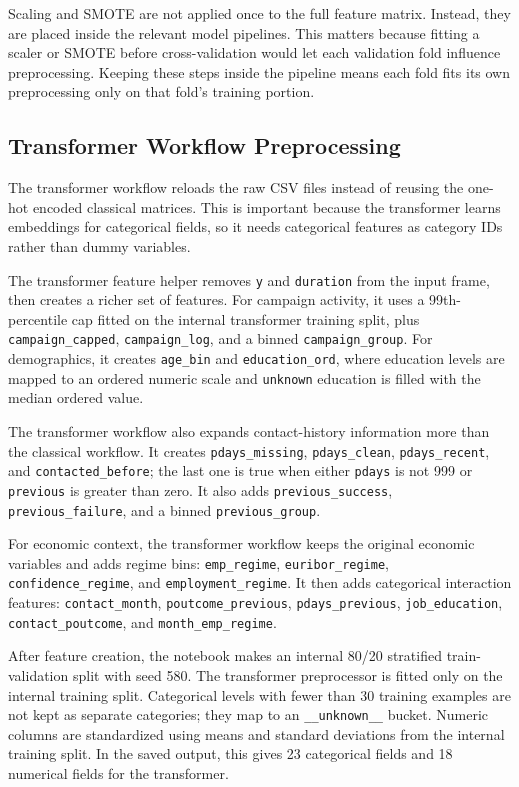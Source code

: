 \documentclass[10pt,twocolumn]{article}
\begin{document}
Scaling and SMOTE are not applied once to the full feature matrix. Instead, they are placed inside the relevant model pipelines. This matters because fitting a scaler or SMOTE before cross-validation would let each validation fold influence preprocessing. Keeping these steps inside the pipeline means each fold fits its own preprocessing only on that fold's training portion.

\subsection{Transformer Workflow Preprocessing}
The transformer workflow reloads the raw CSV files instead of reusing the one-hot encoded classical matrices. This is important because the transformer learns embeddings for categorical fields, so it needs categorical features as category IDs rather than dummy variables.

The transformer feature helper removes \texttt{y} and \texttt{duration} from the input frame, then creates a richer set of features. For campaign activity, it uses a 99th-percentile cap fitted on the internal transformer training split, plus \texttt{campaign\_capped}, \texttt{campaign\_log}, and a binned \texttt{campaign\_group}. For demographics, it creates \texttt{age\_bin} and \texttt{education\_ord}, where education levels are mapped to an ordered numeric scale and \texttt{unknown} education is filled with the median ordered value.

The transformer workflow also expands contact-history information more than the classical workflow. It creates \texttt{pdays\_missing}, \texttt{pdays\_clean}, \texttt{pdays\_recent}, and \texttt{contacted\_before}; the last one is true when either \texttt{pdays} is not 999 or \texttt{previous} is greater than zero. It also adds \texttt{previous\_success}, \texttt{previous\_failure}, and a binned \texttt{previous\_group}.

For economic context, the transformer workflow keeps the original economic variables and adds regime bins: \texttt{emp\_regime}, \texttt{euribor\_regime}, \texttt{confidence\_regime}, and \texttt{employment\_regime}. It then adds categorical interaction features: \texttt{contact\_month}, \texttt{poutcome\_previous}, \texttt{pdays\_previous}, \texttt{job\_education}, \texttt{contact\_poutcome}, and \texttt{month\_emp\_regime}.

After feature creation, the notebook makes an internal 80/20 stratified train-validation split with seed 580. The transformer preprocessor is fitted only on the internal training split. Categorical levels with fewer than 30 training examples are not kept as separate categories; they map to an \texttt{\_\_unknown\_\_} bucket. Numeric columns are standardized using means and standard deviations from the internal training split. In the saved output, this gives 23 categorical fields and 18 numerical fields for the transformer.
\end{document}
